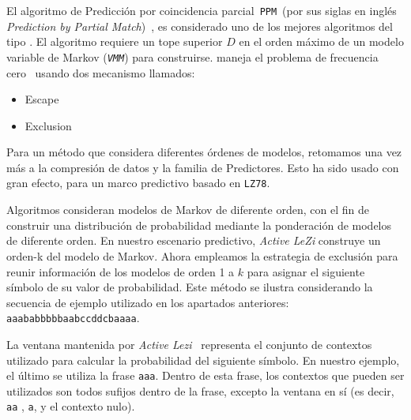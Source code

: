 


El algoritmo de Predicción por coincidencia parcial~\texttt{PPM}~(por sus siglas en inglés \emph{Prediction by Partial Match})~\cite{Shkarin2002 }, es considerado uno de los mejores algoritmos del tipo \losslessdatacompression. El algoritmo requiere un tope superior $D$ en el orden máximo  de un modelo variable de Markov (\emph{\texttt{VMM}}) para construirse. \PPM maneja el problema de frecuencia cero~\cite{Begleiter2004} usando dos mecanismo llamados:
	\begin{itemize}
		\menorEspacioItemize
		\item Escape
		\item Exclusion
	\end{itemize}
	
Para un método que considera diferentes órdenes de modelos, retomamos una vez más a la compresión de datos y la familia de Predictores.  Esto ha sido usado con gran efecto, para un marco predictivo basado en \texttt{LZ78}. 

Algoritmos  \PPM consideran modelos de Markov de diferente orden,  con el fin de construir una distribución de probabilidad mediante la ponderación de modelos de diferente orden. En nuestro escenario predictivo, \emph{Active LeZi} construye un orden-k del modelo de Markov. Ahora empleamos la estrategia \PPM de exclusión para reunir información de los modelos de orden 1 a $k$ para asignar el siguiente símbolo de su valor de probabilidad. Este método se ilustra considerando la secuencia de ejemplo utilizado en los apartados anteriores: \texttt{aaababbbbbaabccddcbaaaa}.

La ventana mantenida por \emph{Active Lezi}~\cite{Gopalratnam2007} representa el conjunto de contextos utilizado para calcular la probabilidad  del siguiente símbolo. En nuestro ejemplo, el último se utiliza la frase \texttt{aaa}. Dentro de esta frase, los contextos que pueden ser utilizados son todos sufijos dentro de la frase, excepto la ventana en sí (es decir, \texttt{aa} , \texttt{a}, y el contexto nulo).

	
